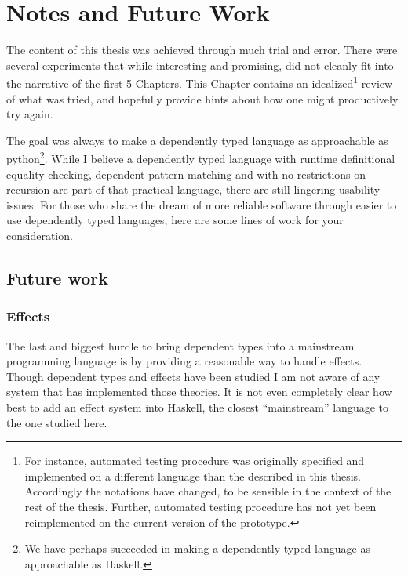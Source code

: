 \chapter{Notes and Future Work}
\label{chapter:Notes}
\thispagestyle{myheadings}
 
The content of this thesis was achieved through much trial and error.
There were several experiments that while interesting and promising, did not cleanly fit into the narrative of the first 5 Chapters.
This Chapter contains an idealized\footnote{
  For instance, automated testing procedure was originally specified and implemented on a different language than the \clang{} described in this thesis.
  Accordingly the notations have changed, to be sensible in the context of the rest of the thesis. %
  Further, automated testing procedure has not yet been reimplemented on the current version of the prototype.
} review of what was tried, and hopefully provide hints about how one might productively try again.
 
The goal was always to make a dependently typed language as approachable as python\footnote{
  We have perhaps succeeded in making a dependently typed language as approachable as Haskell.
}.
While I believe a \fullSp{} dependently typed language with runtime definitional equality checking, dependent pattern matching and with no restrictions on recursion are part of that practical language, there are still lingering usability issues.
For those who share the dream of more reliable software through easier to use dependently typed languages, here are some lines of work for your consideration.

 


\section{Future work}


\subsection{Effects}

The last and biggest hurdle to bring dependent types into a mainstream programming language is by providing a reasonable way to handle effects.
Though dependent types and effects have been studied I am not aware of any \fullSp{} system that has implemented those theories.
It is not even completely clear how best to add an effect system into Haskell, the closest ``mainstream'' language to the one studied here.

